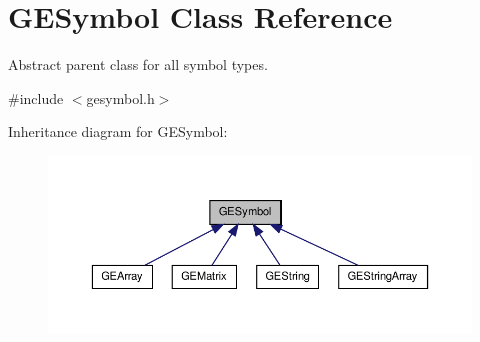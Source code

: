 \hypertarget{class_g_e_symbol}{\section{G\-E\-Symbol Class Reference}
\label{class_g_e_symbol}
}


Abstract parent class for all symbol types.  




{\ttfamily \#include $<$gesymbol.\-h$>$}



Inheritance diagram for G\-E\-Symbol\-:\nopagebreak
\begin{figure}[H]
\begin{center}
\leavevmode
\includegraphics[width=350pt]{class_g_e_symbol__inherit__graph}
\end{center}
\end{figure}
